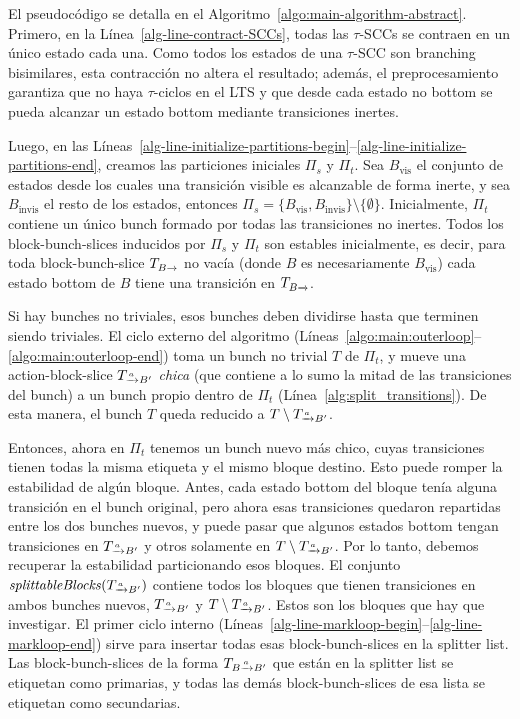 El pseudocódigo se detalla en el Algoritmo~\ref{algo:main-algorithm-abstract}.
Primero, en la Línea~\ref{alg-line-contract-SCCs},
todas las $\tau$-SCCs se contraen en un único estado cada una.
Como todos los estados de una $\tau$-SCC son branching bisimilares, esta contracción no altera el resultado;
además, el preprocesamiento garantiza que no haya $\tau$-ciclos en el LTS
y que desde cada estado no bottom se pueda alcanzar un estado bottom mediante transiciones inertes.

Luego, en las Líneas~\ref{alg-line-initialize-partitions-begin}--\ref{alg-line-initialize-partitions-end},
creamos las particiones iniciales $\Pi_s$ y $\Pi_t$.
Sea $B_\text{vis}$ el conjunto de estados desde los cuales una transición visible es alcanzable de forma inerte,
y sea $B_\text{invis}$ el resto de los estados,
entonces $\Pi_s = \{ B_\text{vis}, B_\text{invis} \} \setminus \{ \emptyset \}$.
Inicialmente, $\Pi_t$ contiene un único bunch formado por todas las transiciones no inertes.
Todos los block-bunch-slices inducidos por $\Pi_s$ y $\Pi_t$ son estables inicialmente,
es decir, para toda block-bunch-slice $\TB$ no vacía (donde $B$ es necesariamente $B_\text{vis}$) cada estado bottom de $B$ tiene una transición en $\TB$.


Si hay bunches no triviales,
esos bunches deben dividirse hasta que terminen siendo triviales.
El ciclo externo del algoritmo (Líneas~\ref{algo:main:outerloop}--\ref{algo:main:outerloop-end}) toma un bunch no trivial $T$ de $\Pi_t$,
y mueve una action-block-slice $\TaB$ \emph{chica} (que contiene a lo sumo la mitad de las transiciones del bunch)
a un bunch propio dentro de $\Pi_t$ (Línea~\ref{alg:split_transitions}).
De esta manera, el bunch $T$ queda reducido a $T\setminus \TaB$.

Entonces, ahora en $\Pi_t$ tenemos un bunch nuevo más chico, cuyas transiciones tienen todas la misma etiqueta y el mismo bloque destino. Esto puede romper la estabilidad de algún bloque. Antes, cada estado bottom del bloque tenía alguna transición en el bunch original, pero ahora esas transiciones quedaron repartidas entre los dos bunches nuevos, y puede pasar que algunos estados bottom tengan transiciones en $\TaB$ y otros solamente en $T \setminus \TaB$. Por lo tanto, debemos recuperar la estabilidad particionando esos bloques. El conjunto $\splittableBlocks(\TaB)$ contiene todos los bloques que tienen transiciones en ambos bunches nuevos, $\TaB$ y $T\setminus \TaB$.
Estos son los bloques que hay que investigar. El primer ciclo interno (Líneas~\ref{alg-line-markloop-begin}--\ref{alg-line-markloop-end})
sirve para insertar todas esas block-bunch-slices en la splitter list.
Las block-bunch-slices de la forma $\TBaB$ que están en la splitter list se etiquetan como primarias,
y todas las demás block-bunch-slices de esa lista se etiquetan como secundarias.

